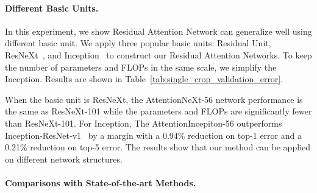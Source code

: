 \documentclass[10pt,twocolumn,letterpaper]{article}
\begin{document}
\paragraph{Different Basic Units.}
%
In this experiment, we show Residual Attention Network can generalize well using different basic unit. We apply three popular basic units: Residual Unit, ResNeXt~\cite{resnext}, and Inception~\cite{inception} to construct our Residual Attention Networks. To keep the number of parameters and FLOPs in the same scale, we simplify the Inception. Results are shown in Table~\ref{tab:single_crop_validation_error}.

%
%
When the basic unit is ResNeXt, the AttentionNeXt-56 network performance is the same as ResNeXt-101 while the parameters and FLOPs are significantly fewer than ResNeXt-101.
%
For Inception, The AttentionIncepiton-56 outperforms Inception-ResNet-v1~\cite{inception} by a margin with a 0.94\% reduction on top-1 error and a 0.21\% reduction on top-5 error.
%
The results show that our method can be applied on different network structures.

\paragraph{Comparisons with State-of-the-art Methods.}

\end{document}
